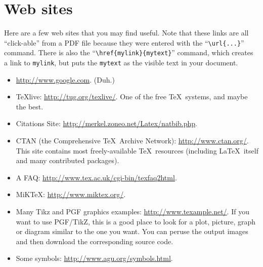 \chapter{Web sites}
\label{chap:websites}

Here are a few web sites that you may find useful.  Note that these
links are all ``click-able'' from a PDF file because they were entered with
the ``\verb|\url{...}|'' command.  There is also the
``\verb|\href{mylink}{mytext}|'' command, which creates a link to
\verb|mylink|, but puts the \verb|mytext| as the visible text in your
document.

\begin{itemize}
    \item \url{http://www.google.com}.  (Duh.)
    \item \TeX{}live: \url{http://tug.org/texlive/}.
	One of the free \TeX\ systems, and maybe the best.
    \item Citations Site: \url{http://merkel.zoneo.net/Latex/natbib.php}.
    \item CTAN (the Comprehensive \TeX\ Archive Network):
	\url{http://www.ctan.org/}.  This site contains most
	freely-available \TeX\ resources (including \LaTeX\ itself and
	many contributed packages).
    \item A FAQ: \url{http://www.tex.ac.uk/cgi-bin/texfaq2html}.
    \item MiKTeX: \url{http://www.miktex.org/}.
    \item Many Tikz and PGF graphics examples:
	\url{http://www.texample.net/}.
	If you want to use PGF/TikZ, this is a good place to look for
	a plot, picture, graph or diagram similar to the one you want.
	You can peruse the output images and then download the
	corresponding source code.
    \item Some symbols: \url{http://www.agu.org/symbols.html}.
\end{itemize}

